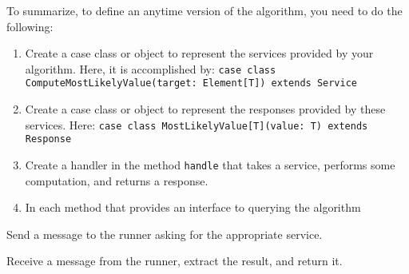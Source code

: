 
To summarize, to define an anytime version of the algorithm, you need to do the following:

\begin{enumerate}
\item Create a case class or object to represent the services provided by your algorithm. Here, it is accomplished by:
\newline \texttt{case class ComputeMostLikelyValue(target: Element[T]) 
\newline extends Service}
\item Create a case class or object to represent the responses provided by these
services. Here:
\newline \texttt{case class MostLikelyValue[T](value: T)
\newline extends Response} 
\item Create a handler in the method \texttt{handle} that takes a service, performs some computation, and returns a response.
\item In each method that provides an interface to querying the algorithm
\end{enumerate}
\begin{aenumerate}
\item Send a message to the runner asking for the appropriate service.
\item Receive a message from the runner, extract the result, and return it.
\end{aenumerate}
